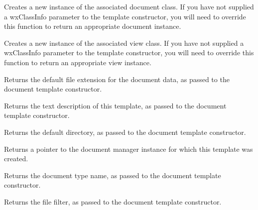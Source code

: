 

Creates a new instance of the associated document class. If you have not supplied
a wxClassInfo parameter to the template constructor, you will need to override this
function to return an appropriate document instance.



Creates a new instance of the associated view class. If you have not supplied
a wxClassInfo parameter to the template constructor, you will need to override this
function to return an appropriate view instance.



Returns the default file extension for the document data, as passed to the document template constructor.



Returns the text description of this template, as passed to the document template constructor.



Returns the default directory, as passed to the document template constructor.



Returns a pointer to the document manager instance for which this template was created.



Returns the document type name, as passed to the document template constructor.



Returns the file filter, as passed to the document template constructor.

